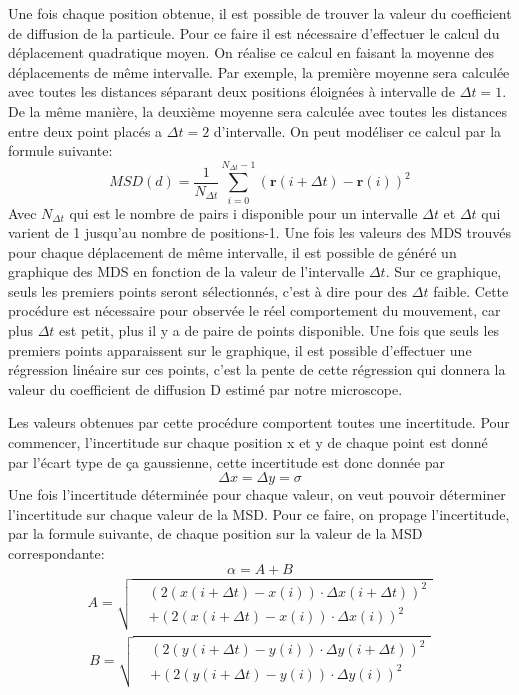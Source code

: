 \documentclass[conference]{IEEEtran}
\begin{document}
Une fois chaque position obtenue, il est possible de trouver la valeur du coefficient de diffusion de la particule. 
Pour ce faire il est nécessaire d'effectuer le calcul du déplacement quadratique moyen. On réalise ce calcul en faisant la moyenne des déplacements de même intervalle. Par exemple, 
la première moyenne sera calculée avec toutes les distances séparant deux positions éloignées à intervalle de $\Delta t=1$. De la même manière, la deuxième moyenne sera calculée avec toutes les distances
entre deux point placés a $\Delta t=2$ d'intervalle. On peut modéliser ce calcul par la formule suivante: 
\begin{equation}
  MSD(d) = \frac{1}{N_{\Delta t}} \sum_{i=0}^{N_{\Delta t} - 1} \left( \mathbf{r}(i+\Delta t) - \mathbf{r}(i) \right)^2
\end{equation}
Avec $N_{\Delta t}$ qui est le nombre de pairs i disponible pour un intervalle $\Delta t$ et $\Delta t$ qui varient de 1 jusqu'au nombre de positions-1. 
Une fois les valeurs des MDS trouvés pour chaque déplacement de même intervalle, il est possible de généré un graphique 
des MDS en fonction de la valeur de l'intervalle $\Delta t$. Sur ce graphique, seuls les premiers points seront sélectionnés, c'est à dire pour des $\Delta t$ faible.
Cette procédure est nécessaire pour observée le réel comportement du mouvement, car plus $\Delta t$ est petit, plus il y a de paire de points disponible. 
Une fois que seuls les premiers points apparaissent sur le graphique, il est possible d'effectuer une régression linéaire sur
ces points, c'est la pente de cette régression qui donnera la valeur du coefficient de diffusion D estimé par notre microscope. 

Les valeurs obtenues par cette procédure comportent toutes une incertitude. Pour commencer, l'incertitude sur chaque 
position x et y de chaque point est donné par l'écart type de ça gaussienne, cette incertitude est donc donnée par 
\begin{equation}
  \Delta x=\Delta y=\sigma 
\end{equation}
Une fois l'incertitude déterminée pour chaque valeur, on veut pouvoir déterminer l'incertitude sur chaque valeur de la MSD. 
Pour ce faire, on propage l'incertitude, par la formule suivante, de chaque position sur la valeur de la MSD  correspondante: 
\begin{equation}
  \alpha =A+B
\end{equation}
\begin{align*}
  A = \sqrt{
    \begin{aligned}
      &\left( 2(x(i+\Delta t) - x(i))\cdot \Delta x(i+\Delta t) \right)^2 \\
      &+ \left( 2(x(i+\Delta t) - x(i))\cdot \Delta x(i) \right)^2
    \end{aligned}
  }
\end{align*}
\begin{align*}
  B = \sqrt{
    \begin{aligned}
      &\left( 2(y(i+\Delta t) - y(i))\cdot \Delta y(i+\Delta t) \right)^2 \\
      &+ \left( 2(y(i+\Delta t) - y(i))\cdot \Delta y(i) \right)^2
    \end{aligned}
  }
\end{align*}
\end{document}
